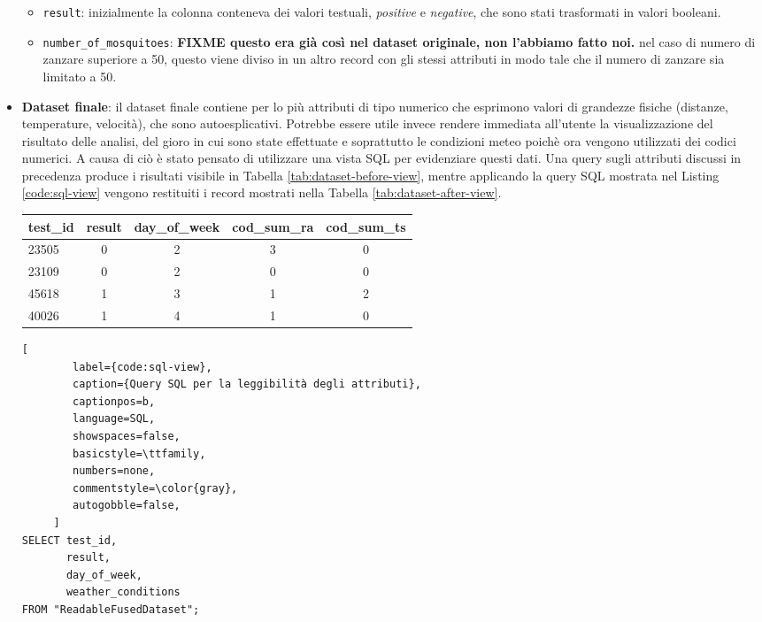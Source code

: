 \begin{itemize}
\begin{itemize}
		\item \texttt{result}: inizialmente la colonna conteneva dei valori  
		testuali, \textit{positive} e \textit{negative}, che sono stati 
		trasformati in valori booleani.  
		
    \item \texttt{number\_of\_mosquitoes}: \textbf{FIXME questo era già 
		così nel dataset originale, non l'abbiamo fatto noi.} nel caso di 
		numero di zanzare superiore a 50, questo viene diviso in un altro 
		record con gli stessi attributi in modo tale che il numero di zanzare 
		sia limitato a 50.  
			
	\end{itemize}
	
	\item \textbf{Dataset finale}: il dataset finale contiene per lo più 
	attributi di tipo numerico che esprimono valori di grandezze fisiche 
	(distanze, temperature, velocità), che sono autoesplicativi. Potrebbe 
	essere utile invece rendere immediata all'utente la visualizzazione del 
	risultato delle analisi, del gioro in cui sono state effettuate e 
	soprattutto le condizioni meteo poichè ora vengono utilizzati dei codici 
	numerici. A causa di ciò è stato pensato di utilizzare una vista SQL per 
	evidenziare questi dati. Una query sugli attributi discussi in precedenza 
	produce i risultati visibile in Tabella \ref{tab:dataset-before-view}, 
	mentre applicando la query SQL mostrata nel Listing \ref{code:sql-view} 
	vengono restituiti i record mostrati nella 
	Tabella \ref{tab:dataset-after-view}.

	\vspace{.5em}
	\begin{centering}
		\begin{tabular}{lcccc}
			\toprule
			test\_id & result & day\_of\_week & cod\_sum\_ra & cod\_sum\_ts \\
			\midrule
			23505 & 0 & 2 & 3 & 0 \\
			23109 &	0 & 2 & 0 & 0 \\
			45618 &	1 & 3 & 1 & 2 \\
			40026 &	1 & 4 & 1 & 0 \\
			\bottomrule
		\end{tabular}
		\label{tab:dataset-before-view}
	\end{centering}

	\begin{lstlisting}[
		label={code:sql-view},
		caption={Query SQL per la leggibilità degli attributi},
		captionpos=b,
		language=SQL,
		showspaces=false,
		basicstyle=\ttfamily,
		numbers=none,
		commentstyle=\color{gray},
		autogobble=false,
	 ]
SELECT test_id, 
       result, 
       day_of_week, 
       weather_conditions
FROM "ReadableFusedDataset";
	\end{lstlisting}


\end{itemize}
